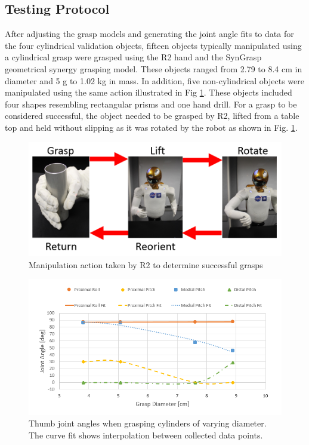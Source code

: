 \documentclass[runningheads,a4paper]{llncs}
\begin{document}
\subsection{Testing Protocol}
After adjusting the grasp models and generating the joint angle fits to data for the four cylindrical validation objects, fifteen objects typically manipulated using a cylindrical grasp were grasped using the R2 hand and the SynGrasp geometrical synergy grasping model. These objects ranged from 2.79 to 8.4 cm in diameter and 5 g to 1.02 kg in mass. In addition, five non-cylindrical objects were manipulated using the same action illustrated in Fig \ref{testing}. These objects included four shapes resembling rectangular prisms and one hand drill. For a grasp to be considered successful, the object needed to be grasped by R2, lifted from a table top and held without slipping as it was rotated by the robot as shown in Fig. \ref{testing}.

\begin{figure}[!b]
 \centering
 \includegraphics[width=\linewidth]{manipulation}
 \caption{Manipulation action taken by R2 to determine successful grasps}
 \label{testing}
\end{figure}

\begin{figure}[!b]
 \centering
 \includegraphics[width=1.08\linewidth]{thumb_fits_3}
 \caption{Thumb joint angles when grasping cylinders of varying diameter. The curve fit shows interpolation between collected data points.}
 \label{thumb_fits} 
\end{figure}
\end{document}

